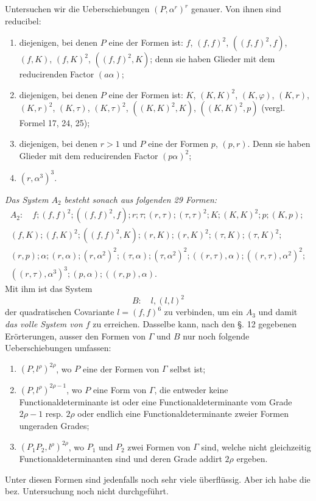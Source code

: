 \documentclass[10pt]{article}
\begin{document}
Untersuchen wir die Ueberschiebungen $(P,\alpha^r)^r$ genauer. Von ihnen sind reducibel:
\begin{enumerate}
\item diejenigen, bei denen $P$ eine der Formen ist: $f$, $(f,f)^2$, $((f,f)^2,f)$, $(f,K)$, $(f,K)^2$, $((f,f)^2,K)$; denn sie haben Glieder mit dem reducirenden Factor $(a\alpha)$;
\item diejenigen, bei denen $P$ eine der Formen ist: $K$, $(K,K)^2$, $(K,\varphi)$, $(K,r)$, $(K,r)^2$, $(K,\tau)$, $(K,\tau)^2$, $((K,K)^2,K)$, $((K,K)^2,p)$ (vergl. Formel 17, 24, 25);
\item diejenigen, bei denen $r>1$ und $P$ eine der Formen $p$, $(p,r)$. Denn sie haben Glieder mit dem reducirenden Factor $(p\alpha)^2$;
\item $(r,\alpha^3)^3$.
\end{enumerate}
\textit{Das System $A_2$ besteht sonach aus folgenden 29 Formen:}
\[
\begin{gathered}
A_2:
\quad f;(f,f)^2;((f,f)^2,f);r;\tau;(r,\tau);(\tau,\tau)^2;K;(K,K)^2;p;(K,p);\\
(f,K);(f,K)^2;((f,f)^2,K);(r,K);(r,K)^2;(\tau,K);(\tau,K)^2;\\
(r,p);\alpha;(r,\alpha);(r,\alpha^2)^2;(\tau,\alpha);(\tau,\alpha^2)^2;((r,\tau),\alpha);((r,\tau),\alpha^2)^2;\\
((r,\tau),\alpha^3)^3;(p,\alpha);((r,p),\alpha).
\end{gathered}
\]
Mit ihm ist das System
\[
B:
\quad l,(l,l)^2
\]
der quadratischen Covariante $l=(f,f)^6$ zu verbinden, um ein $A_3$ und damit \textit{das volle System von $f$} zu erreichen. Dasselbe kann, nach den §. 12 gegebenen Erörterungen, ausser den Formen von $\Gamma$ und $B$ nur noch folgende Ueberschiebungen umfassen:
\begin{enumerate}
\item[I.] $(P,l^\rho)^{2\rho}$, wo $P$ eine der Formen von $\Gamma$ selbst ist;
\item[II.] $(P,l^\rho)^{2\rho-1}$, wo $P$ eine Form von $\Gamma$, die entweder keine Functionaldeterminante ist oder eine Functionaldeterminante vom Grade $2\rho-1$ resp. $2\rho$ oder endlich eine Functionaldeterminante zweier Formen ungeraden Grades;
\item[III.] $(P_1P_2,l^\rho)^{2\rho}$, wo $P_1$ und $P_2$ zwei Formen von $\Gamma$ sind, welche nicht gleichzeitig Functionaldeterminanten sind und deren Grade addirt $2\rho$ ergeben.
\end{enumerate}
Unter diesen Formen sind jedenfalls noch sehr viele überflüssig. Aber ich habe die bez. Untersuchung noch nicht durchgeführt.
\end{document}
